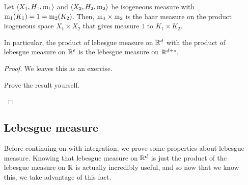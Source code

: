 \begin{prp}
Let $\langle X_1,H_1,\mathrm{m} _1\rangle$ and $\langle X_2,H_2,\mathrm{m} _2\rangle$ be isogeneous measure with $\mathrm{m} _1(K_1)=1=\mathrm{m} _2(K_2)$.  Then, $\mathrm{m} _1\times \mathrm{m} _2$ is the haar measure on the product isogeneous space $X_1\times X_2$ that gives measure $1$ to $K_1\times K_2$.
\begin{rmk}
In particular, the product of lebesgue measure on $\mathbb{R} ^d$ with the product of lebesgue measure on $\mathbb{R} ^e$ is the lebesgue measure on $\mathbb{R} ^{d+e}$.
\end{rmk}
\begin{proof}
We leaves this as an exercise.
\begin{exr}
Prove the result yourself.
\end{exr}
\end{proof}
\end{prp}

\subsection{Lebesgue measure}

Before continuing on with integration, we prove some properties about lebesgue measure.  Knowing that lebesgue measure on $\mathbb{R} ^d$ is just the product of the lebesgue measure on $\mathbb{R}$ is actually incredibly useful, and so now that we know this, we take advantage of this fact.

